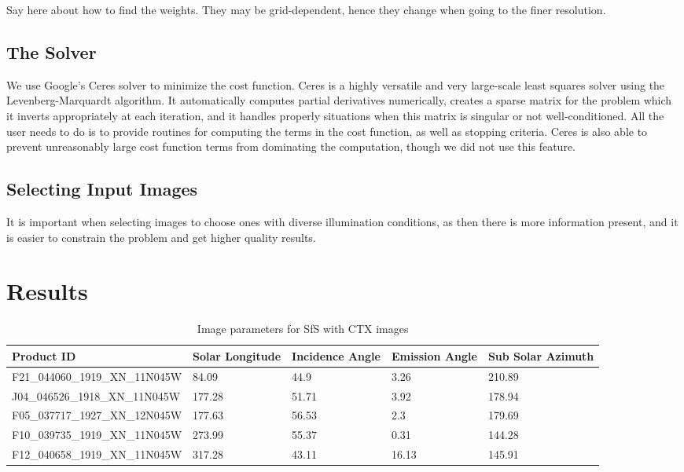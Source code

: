 \documentclass[draft,linenumbers]{agujournal}
\begin{document}
Say here about how to find the weights. They may be grid-dependent, hence they change when going to the finer resolution. 

\subsection{The Solver}

We use Google's Ceres solver \citep{agarwal2012ceres} to minimize
the cost function. Ceres is a highly versatile and very large-scale
least squares solver using the Levenberg-Marquardt algorithm. It
automatically computes partial derivatives numerically, creates a
sparse matrix for the problem which it inverts appropriately at
each iteration, and it handles properly situations when this matrix
is singular or not well-conditioned. All the user needs to do is
to provide routines for computing the terms in the cost function,
as well as stopping criteria. Ceres is also able to prevent
unreasonably large cost function terms from dominating the computation,
though we did not use this feature.

\subsection{Selecting Input Images}

It is important when selecting images to choose ones with diverse illumination conditions, as then there is more information present, and it is easier to constrain the problem and get higher quality results. 

\section{Results}

\begin{table}[h]
\caption{Image parameters for SfS with CTX images}
\label{ctximages}
\centering
\begin{tabular}{lp{2cm}p{2cm}p{2cm}p{2cm}}
\hline
Product ID & Solar Longitude & Incidence Angle & Emission Angle & Sub Solar Azimuth \\
\hline
 F21\_044060\_1919\_XN\_11N045W  &   84.09  & 44.9  & 3.26   & 210.89 \\ 
 J04\_046526\_1918\_XN\_11N045W  &  177.28  & 51.71 & 3.92   & 178.94 \\ 
 F05\_037717\_1927\_XN\_12N045W  &  177.63  & 56.53 & 2.3    & 179.69 \\
 F10\_039735\_1919\_XN\_11N045W  &  273.99  & 55.37 & 0.31   & 144.28 \\ 
 F12\_040658\_1919\_XN\_11N045W  &  317.28  & 43.11 & 16.13  & 145.91 \\
\hline    
\end{tabular}
\end{table}
\end{document}
